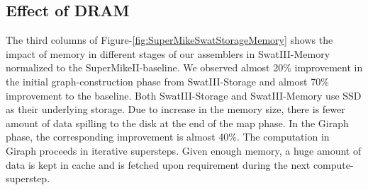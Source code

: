 \documentclass[conference]{IEEEtran}
\begin{document}
\subsection {Effect of DRAM} \label{EffectOfDRAM}
The third columns of Figure-\ref{fig:SuperMikeSwatStorageMemory} shows the impact of memory in different stages of our assemblers in SwatIII-Memory normalized to the SuperMikeII-baseline. 
We observed almost 20\% improvement in the initial graph-construction phase from SwatIII-Storage and almost 70\% improvement to the baseline. Both SwatIII-Storage and SwatIII-Memory use SSD as their underlying storage. Due to increase in the memory size, there is fewer amount of data spilling to the disk at the end of the map phase.
In the Giraph phase, the corresponding improvement is almost 40\%. The computation in Giraph proceeds in iterative supersteps. Given enough memory, a huge amount of data is kept in cache and is fetched upon requirement during the next compute-superstep.
\end{document}
